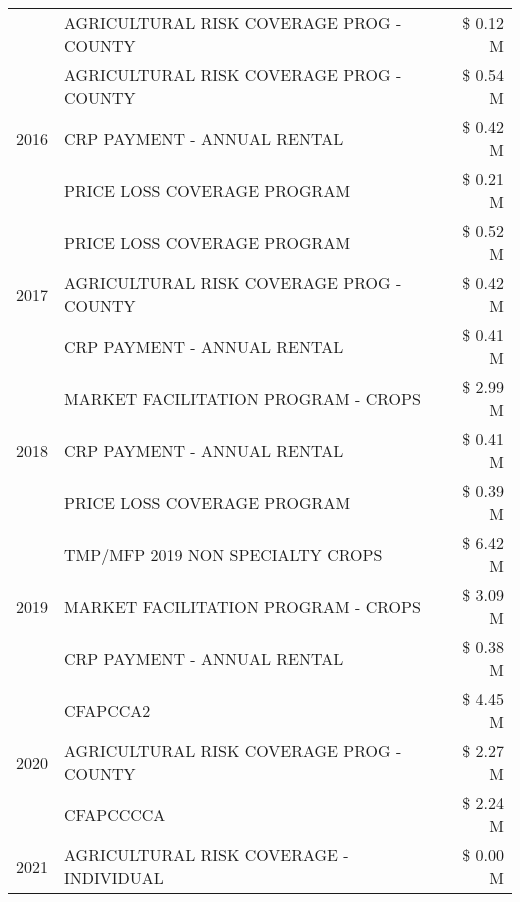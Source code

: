 \begin{tabular}{llr}
 & AGRICULTURAL RISK COVERAGE PROG - COUNTY & \$ 0.12 M \\
\cline{1-3}
\multirow[t]{3}{*}{2016} & AGRICULTURAL RISK COVERAGE PROG - COUNTY & \$ 0.54 M \\
 & CRP PAYMENT - ANNUAL RENTAL & \$ 0.42 M \\
 & PRICE LOSS COVERAGE PROGRAM & \$ 0.21 M \\
\cline{1-3}
\multirow[t]{3}{*}{2017} & PRICE LOSS COVERAGE PROGRAM & \$ 0.52 M \\
 & AGRICULTURAL RISK COVERAGE PROG - COUNTY & \$ 0.42 M \\
 & CRP PAYMENT - ANNUAL RENTAL & \$ 0.41 M \\
\cline{1-3}
\multirow[t]{3}{*}{2018} & MARKET FACILITATION PROGRAM - CROPS & \$ 2.99 M \\
 & CRP PAYMENT - ANNUAL RENTAL & \$ 0.41 M \\
 & PRICE LOSS COVERAGE PROGRAM & \$ 0.39 M \\
\cline{1-3}
\multirow[t]{3}{*}{2019} & TMP/MFP 2019 NON SPECIALTY CROPS & \$ 6.42 M \\
 & MARKET FACILITATION PROGRAM - CROPS & \$ 3.09 M \\
 & CRP PAYMENT - ANNUAL RENTAL & \$ 0.38 M \\
\cline{1-3}
\multirow[t]{3}{*}{2020} & CFAPCCA2 & \$ 4.45 M \\
 & AGRICULTURAL RISK COVERAGE PROG - COUNTY & \$ 2.27 M \\
 & CFAPCCCCA & \$ 2.24 M \\
\cline{1-3}
2021 & AGRICULTURAL RISK COVERAGE - INDIVIDUAL & \$ 0.00 M \\
\cline{1-3}
\bottomrule
\end{tabular}
